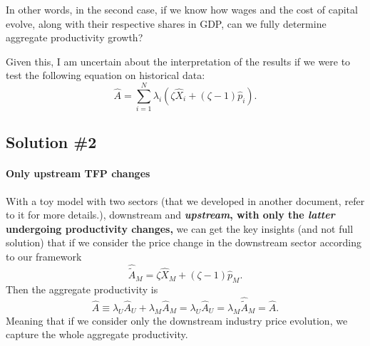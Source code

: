 \documentclass[11pt]{article}
\begin{document}
In other words, in the second case, if we know how wages and the cost of capital evolve, along with their respective shares in GDP, can we fully determine aggregate productivity growth? 

Given this, I am uncertain about the interpretation of the results if we were to test the following equation on historical data:
\begin{equation*}
    \hat{A}=\sum_{i=1}^N\lambda_i (\zeta\hat{X}_i+(\zeta-1)\hat{p}_i).
\end{equation*}


\newpage

\subsection{Solution \#2}






\paragraph{Only upstream TFP changes\\}
With a toy model with two sectors (that we developed in another document, refer to it for more details.), downstream and \textbf{\textit{upstream}, with only the \textit{latter} undergoing productivity changes, }we can get the key insights (and not full solution) that if we consider the price change in the downstream sector according to our framework 
\begin{equation}
    \hat{\tilde{A}}_M =  \zeta \hat{X}_M + (\zeta - 1) \hat{p}_M.
\end{equation}
Then the aggregate productivity is
\begin{equation}
      \hat{A} 
      \equiv 
    \lambda_U  \hat{A}_U  +  \lambda_M  \hat{A}_M
     =  \lambda_U  \hat{A}_U=  \lambda_M  \hat{\tilde{A}}_M =\hat{A}.
\end{equation}
Meaning that if we consider only the downstream industry price evolution, we capture the whole aggregate productivity. 
\end{document}
